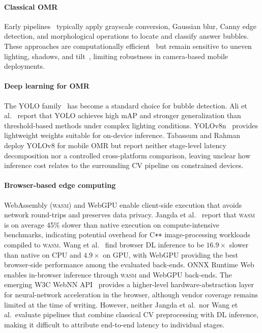 \documentclass[conference]{IEEEtran}
\newcommand{\wasm}{\textsc{wasm}}
\begin{document}
\paragraph{Classical OMR}
Early pipelines~\cite{patel2015,okorie2022} typically apply grayscale conversion, Gaussian blur, Canny edge detection, and
morphological operations to locate and classify answer bubbles. These approaches are computationally efficient~\cite{mao2017} but remain sensitive to uneven lighting, shadows, and tilt~\cite{afifi2019}, limiting robustness in camera-based mobile deployments. 

\paragraph{Deep learning for OMR}
The YOLO family~\cite{redmon2016} has become a standard choice for bubble detection. Ali et al.~\cite{ali2025} report that YOLO achieves high mAP and stronger generalization than threshold-based methods under complex lighting conditions. YOLOv8n~\cite{jocher2023} provides lightweight weights suitable for on-device inference. Tabassum and Rahman~\cite{tabassum2024} deploy YOLOv8 for mobile OMR but report neither stage-level latency decomposition nor a controlled cross-platform comparison, leaving unclear how inference cost relates to the surrounding CV pipeline on constrained devices.

\paragraph{Browser-based edge computing}
WebAssembly (\wasm{}) and WebGPU enable client-side execution that avoids network round-trips and preserves data privacy.
Jangda et al.~\cite{jangda2019} report that \wasm{} is on average 45\% slower than native execution on compute-intensive benchmarks, indicating potential overhead for C\texttt{++} image-processing workloads compiled to \wasm{}. Wang et al.~\cite{wang2024} find browser DL inference to be $16.9\times$ slower than native on CPU and $4.9\times$ on GPU, with WebGPU providing the best browser-side performance among the evaluated back-ends. ONNX Runtime Web~\cite{microsoft2021} enables in-browser inference through \wasm{} and WebGPU back-ends. The emerging W3C WebNN API~\cite{webnn2024} provides a higher-level hardware-abstraction layer for neural-network acceleration in the browser, although vendor coverage remains limited at the time of writing. However, neither Jangda et al.\ nor Wang et al.\ evaluate pipelines that combine classical CV preprocessing with DL inference, making it difficult to attribute end-to-end latency to individual stages.
\end{document}
